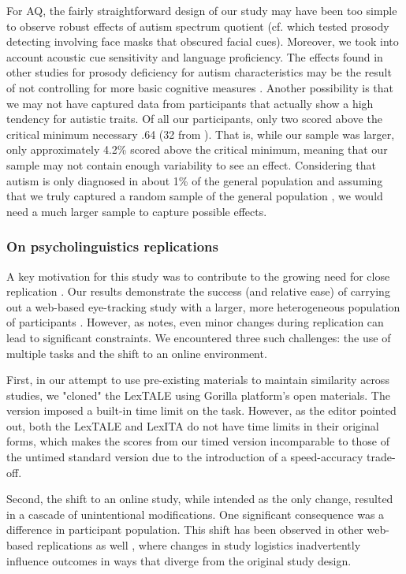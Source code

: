 For AQ, the fairly straightforward design of our study may have been too simple to observe robust effects of autism spectrum quotient (cf. \cite{Sinagra2022} which tested prosody detecting involving face masks that obscured facial cues). Moreover, we took into account acoustic cue sensitivity and language proficiency. The effects found in other studies for prosody deficiency for autism characteristics may be the result of not controlling for more basic cognitive measures \citep{grossman2023relationship}. Another possibility is that we may not have captured data from participants that actually show a high tendency for autistic traits. Of all our participants, only two scored above the critical minimum necessary .64 (32 from \cite{Baron-Cohen2001}). That is, while our sample was larger, only approximately 4.2\% scored above the critical minimum, meaning that our sample may not contain enough variability to see an effect. Considering that autism is only diagnosed in about 1\% of the general population and assuming that we truly captured a random sample of the general population \citep{who2023autism}, we would need a much larger sample to capture possible effects.


\subsubsection{On psycholinguistics replications}
A key motivation for this study was to contribute to the growing need for close replication \citep{Marsden_2018}. Our results demonstrate the success (and relative ease) of carrying out a web-based eye-tracking study with a larger, more heterogeneous population of participants \citep{Vos_2017, bramlett_wiener_24-AOW}. However, as \cite{mcmanus2022replication} notes, even minor changes during replication can lead to significant constraints. We encountered three such challenges: the use of multiple tasks and the shift to an online environment.

First, in our attempt to use pre-existing materials to maintain similarity across studies, we "cloned" the LexTALE using Gorilla platform’s open materials. The version imposed a built-in time limit on the task. However, as the editor pointed out, both the LexTALE and LexITA do not have time limits in their original forms, which makes the scores from our timed version incomparable to those of the untimed standard version due to the introduction of a speed-accuracy trade-off.

Second, the shift to an online study, while intended as the only change, resulted in a cascade of unintentional modifications. One significant consequence was a difference in participant population. This shift has been observed in other web-based replications as well \citep{bramlett_wiener_24-AOW}, where changes in study logistics inadvertently influence outcomes in ways that diverge from the original study design.

